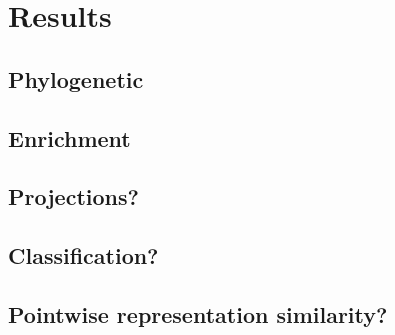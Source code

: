\documentclass[12pt, letterpaper, twocolumn]{article}
\begin{document}
\section{Results}
\subsection{Phylogenetic}
\subsection{Enrichment}
\subsection{Projections?}
\subsection{Classification?}
\subsection{Pointwise representation similarity?}

\onecolumn
\newpage
\FloatBarrier


\end{document}
